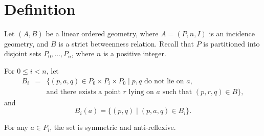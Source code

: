 \documentclass[12pt]{article}
\begin{document}
\section{Definition}
Let $(A,B)$ be a linear ordered geometry, where $A= (P,n,I)$ is an incidence geometry,
and $B$ is a strict betweenness relation. 
Recall that $P$ is partitioned into disjoint sets $P_0, \ldots, P_n$, where $n$ is a positive integer.

For $0\le i<n$, let 
\begin{eqnarray*}
B_i &=& \{(p,a,q)\in P_0 \times P_i \times P_0 \mid   
 p,q \textrm{ do not lie on } a, \\ && \textrm{and there
exists a point } r \textrm{ lying on  } a \textrm{ such that }(p,r,q)\in B\},
\end{eqnarray*}
and
$$
B_i(a)=\lbrace (p,q)\mid (p,a,q)\in
B_i\rbrace .
$$

For any $a\in P_i$, the set  is symmetric and anti-reflexive.  \\ 
\end{document}
